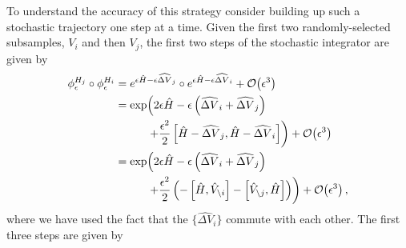 \documentclass{article}
\begin{document}
To understand the accuracy of this strategy consider building up such a 
stochastic trajectory one step at a time.  Given the first two randomly-selected 
subsamples, $V_{i}$ and then $V_{j}$, the first two steps of the stochastic
integrator are given by
%
\begin{align*}
\phi^{H_{j}}_{\epsilon} \circ \phi^{H_{i}}_{\epsilon}
&=
e^{ \epsilon \hat{H} - \epsilon  \widehat{ \Delta V}_{j} } 
\circ e^{ \epsilon \hat{H} - \epsilon  \widehat{ \Delta V}_{i} }
+ \mathcal{O} \! \left( \epsilon^{3} \right)
\\
&=
\exp \! \left( 
2 \epsilon \hat{H} - \epsilon \left(  \widehat{ \Delta V}_{i} +  \widehat{ \Delta V}_{j} \right)
\right.
\\
& \hspace{10mm} \left.
+ \frac{\epsilon^{2}}{2} \left[ \hat{H} -  \widehat{ \Delta V}_{j}, \hat{H} - \widehat{ \Delta V}_{i} \right]
\right)
+ \mathcal{O} \! \left( \epsilon^{3} \right)
\\
&=
\exp \! \left( 
2 \epsilon \hat{H} - \epsilon \left( \widehat{ \Delta V}_{i} + \widehat{ \Delta V}_{j} \right)
\right.
\\
& \hspace{10mm} \left.
+ \frac{\epsilon^{2}}{2} \left(
- \left[ \hat{H}, \hat{V}_{\setminus i} \right]
- \left[ \hat{V}_{\setminus j}, \hat{H} \right] \right) \right)
+ \mathcal{O} \! \left( \epsilon^{3} \right),
\end{align*}
%
where we have used the fact that the $\{ \widehat{ \Delta V}_{i} \}$ commute
with each other.  The first three steps are given by
%
\end{document}
